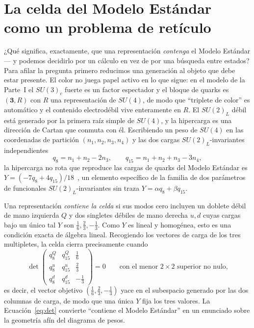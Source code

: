 \documentclass[11pt,a4paper]{article}
\begin{document}
\section{La celda del Modelo Estándar como un problema de retículo}\label{sec:cell}
¿Qué significa, exactamente, que una representación \emph{contenga} el Modelo Estándar --- y
podemos decidirlo por un cálculo en vez de por una búsqueda entre estados? Para afilar la
pregunta primero reducimos una generación al objeto que debe estar presente. El color no
juega papel activo en lo que sigue: en el modelo de la Parte~I el $SU(3)_c$ fuerte es un
factor espectador y el bloque de quarks es $(\mathbf 3, R)$ con $R$ una representación de
$SU(4)$, de modo que ``triplete de color'' es automático y el contenido electrodébil vive
enteramente en $R$. El $SU(2)_L$ débil está generado por la primera raíz simple de $SU(4)$, y
la hipercarga es una dirección de Cartan que conmuta con él. Escribiendo un peso de $SU(4)$ en
las coordenadas de partición $(n_1,n_2,n_3,n_4)$ y las dos cargas $SU(2)_L$-invariantes
independientes
\[
q_8=n_1+n_2-2n_3,\qquad q_{15}=n_1+n_2+n_3-3n_4,
\]
la hipercarga no rota que reproduce las cargas de quarks del Modelo Estándar es
$Y=(-7q_8+4q_{15})/18$~\cite{PartI}, un elemento específico de la familia de dos parámetros de
funcionales $SU(2)_L$-invariantes sin traza $Y=\alpha q_8+\beta q_{15}$.

Una representación \emph{contiene la celda} si sus modos cero incluyen un doblete débil de mano
izquierda $Q$ y dos singletes débiles de mano derecha $u,d$ cuyas cargas bajo un único tal $Y$
son $\tfrac16,\tfrac23,-\tfrac13$. Como $Y$ es lineal y homogénea, esto es una condición exacta
de álgebra lineal. Recogiendo los vectores de carga de los tres multipletes, la celda cierra
precisamente cuando
\begin{equation}\label{eq:det}
\det\!\begin{pmatrix} q_8^{Q} & q_{15}^{Q} & \tfrac16\\[2pt]
q_8^{u} & q_{15}^{u} & \tfrac23\\[2pt] q_8^{d} & q_{15}^{d} & -\tfrac13\end{pmatrix}=0
\qquad\text{con el menor $2\times2$ superior no nulo,}
\end{equation}
es decir, el vector objetivo $(\tfrac16,\tfrac23,-\tfrac13)$ yace en el subespacio generado por
las dos columnas de carga, de modo que una única $Y$ fija los tres valores. La
Ecuación~\eqref{eq:det} convierte ``contiene el Modelo Estándar'' en un enunciado sobre la
geometría afín del diagrama de pesos.
\end{document}
